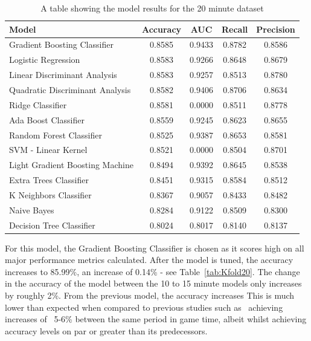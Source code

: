 \begin{table}[h]
    \centering
    \caption{A table showing the model results for the 20 minute dataset}
    \begin{tabular}{l c c c c }
        \toprule
        \textbf{Model} & \textbf{Accuracy} & \textbf{AUC} & \textbf{Recall} & \textbf{Precision} \\
        \midrule
        Gradient Boosting Classifier & 0.8585 & 0.9433 & 0.8782 & 0.8586  \\
        Logistic Regression & 0.8583 & 0.9266 & 0.8648 & 0.8679 \\
        Linear Discriminant Analysis & 0.8583 & 0.9257 & 0.8513 & 0.8780 \\
        Quadratic Discriminant Analysis & 0.8582 & 0.9406 & 0.8706 & 0.8634 \\
        Ridge Classifier & 0.8581 & 0.0000 & 0.8511 & 0.8778 \\
        Ada Boost Classifier & 0.8559 & 0.9245 & 0.8623 & 0.8655 \\
        Random Forest Classifier & 0.8525 & 0.9387 & 0.8653 & 0.8581 \\
        SVM - Linear Kernel & 0.8521 & 0.0000 & 0.8504 & 0.8701 \\
        Light Gradient Boosting Machine & 0.8494 & 0.9392 & 0.8645 & 0.8538  \\
        Extra Trees Classifier & 0.8451 & 0.9315 & 0.8584 & 0.8512 \\
        K Neighbors Classifier & 0.8367 & 0.9057 & 0.8433 & 0.8482 \\
        Naive Bayes & 0.8284 & 0.9122 & 0.8509 & 0.8300 \\
        Decision Tree Classifier & 0.8024 & 0.8017 & 0.8140 & 0.8137\\
        \bottomrule
    \end{tabular}

    \label{tab:ModelResults20}
\end{table}

For this model, the Gradient Boosting Classifier is chosen as it scores high on all major performance metrics calculated.
After the model is tuned, the accuracy increases to 85.99\%, an increase of 0.14\% - see Table~\ref{tab:Kfold20}.
The change in the accuracy of the model between the 10 to 15 minute models only increases by roughly 2\%.
From the previous model, the accuracy increases
This is much lower than expected when compared to previous studies such as~\citet{silva2018continuous, lee2020predicting} achieving increases of ~5-6\% between the same period in game time, albeit whilst achieving accuracy levels on par or greater than its predecessors. \\

